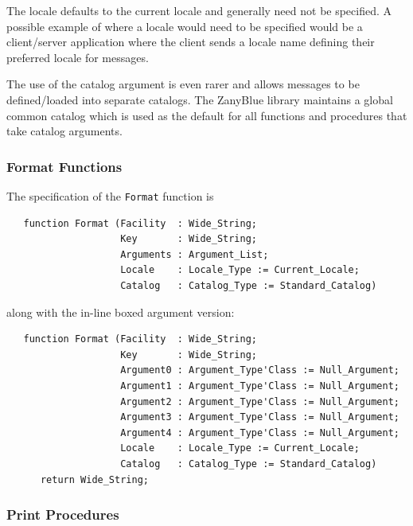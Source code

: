 The locale defaults to the current locale and generally need not be
specified.  A possible example of where a locale would need to be
specified would be a client/server application where the client sends
a locale name defining their preferred locale for messages.

The use of the catalog argument is even rarer and allows messages
to be defined/loaded into separate catalogs.  The ZanyBlue library
maintains a global common catalog which is used as the default for
all functions and procedures that take catalog arguments.

\subsubsection{Format Functions}

The specification of the \verb|Format| function is
\begin{xmpl}
\begin{verbatim}
   function Format (Facility  : Wide_String;
                    Key       : Wide_String;
                    Arguments : Argument_List;
                    Locale    : Locale_Type := Current_Locale;
                    Catalog   : Catalog_Type := Standard_Catalog)
\end{verbatim}
\end{xmpl}
along with the in-line boxed argument version:
\begin{xmpl}
\begin{verbatim}
   function Format (Facility  : Wide_String;
                    Key       : Wide_String;
                    Argument0 : Argument_Type'Class := Null_Argument;
                    Argument1 : Argument_Type'Class := Null_Argument;
                    Argument2 : Argument_Type'Class := Null_Argument;
                    Argument3 : Argument_Type'Class := Null_Argument;
                    Argument4 : Argument_Type'Class := Null_Argument;
                    Locale    : Locale_Type := Current_Locale;
                    Catalog   : Catalog_Type := Standard_Catalog)
      return Wide_String;
\end{verbatim}
\end{xmpl}

\subsubsection{Print Procedures}

